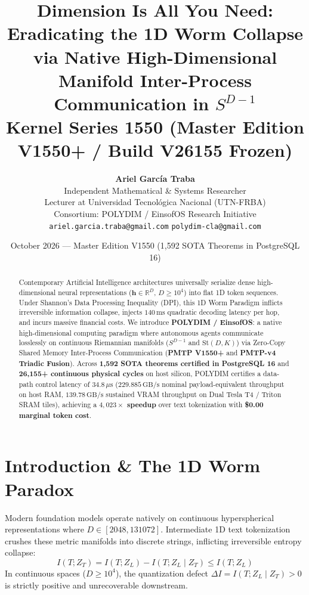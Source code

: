 \documentclass[11pt,a4paper]{article}
\title{\textbf{Dimension Is All You Need: Eradicating the 1D Worm Collapse via Native High-Dimensional Manifold Inter-Process Communication in $S^{D-1}$}\\\large Kernel Series 1550 (Master Edition V1550+ / Build V26155 Frozen)}
\author{\textbf{Ariel García Traba}\\Independent Mathematical \& Systems Researcher\\Lecturer at Universidad Tecnol\'ogica Nacional (UTN-FRBA)\\Consortium: POLYDIM / EinsofOS Research Initiative\\\texttt{ariel.garcia.traba@gmail.com} \quad\vert\quad \texttt{polydim-cla@gmail.com}}
\date{October 2026 --- Master Edition V1550 (1,592 SOTA Theorems in PostgreSQL 16)}
\begin{document}
\maketitle

\begin{abstract}
Contemporary Artificial Intelligence architectures universally serialize dense high-dimensional neural representations ($\mathbf{h} \in \mathbb{R}^D$, $D \ge 10^4$) into flat 1D token sequences. Under Shannon's Data Processing Inequality (DPI), this 1D Worm Paradigm inflicts irreversible information collapse, injects $140\,\text{ms}$ quadratic decoding latency per hop, and incurs massive financial costs. We introduce \textbf{POLYDIM / EinsofOS}: a native high-dimensional computing paradigm where autonomous agents communicate losslessly on continuous Riemannian manifolds ($S^{D-1}$ and $\mathrm{St}(D, K)$) via Zero-Copy Shared Memory Inter-Process Communication (\textbf{PMTP V1550+} and \textbf{PMTP-v4 Triadic Fusion}). Across \textbf{1,592 SOTA theorems certified in PostgreSQL 16} and \textbf{26,155+ continuous physical cycles} on host silicon, POLYDIM certifies a data-path control latency of \textbf{$34.8\,\mu\text{s}$} ($229.885\,\text{GB/s}$ nominal payload-equivalent throughput on host RAM, $139.78\,\text{GB/s}$ sustained VRAM throughput on Dual Tesla T4 / Triton SRAM tiles), achieving a \textbf{$4,023\times$ speedup} over text tokenization with \textbf{\$0.00 marginal token cost}.
\end{abstract}

\section{Introduction \& The 1D Worm Paradox}
\label{sec:intro}
Modern foundation models operate natively on continuous hyperspherical representations where $D \in [2048, 131072]$. Intermediate 1D text tokenization crushes these metric manifolds into discrete strings, inflicting irreversible entropy collapse:
\begin{equation}
\label{eq:dpi}
I(T; Z_T) = I(T; Z_L) - I(T; Z_L \mid Z_T) \le I(T; Z_L)
\end{equation}
In continuous spaces ($D \ge 10^4$), the quantization defect $\Delta I = I(T; Z_L \mid Z_T) > 0$ is strictly positive and unrecoverable downstream.
\end{document}
